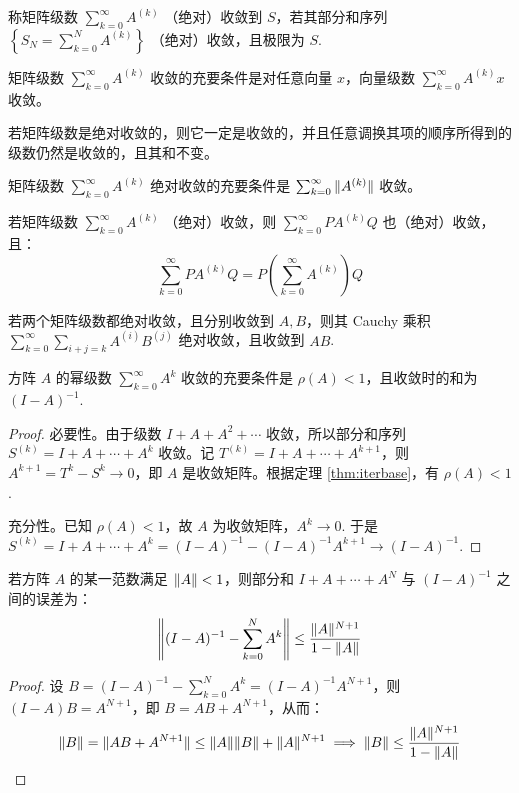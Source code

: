 \begin{definition}[矩阵级数的收敛与绝对收敛]
称矩阵级数 $\sum_{k=0}^\infty A^{(k)}$ （绝对）收敛到 $S$，若其部分和序列 $\left\{S_N=\sum_{k=0}^N A^{(k)}\right\}$ （绝对）收敛，且极限为 $S$.
\end{definition}

\begin{property}
矩阵级数 $\sum_{k=0}^\infty A^{(k)}$ 收敛的充要条件是对任意向量 $x$，向量级数 $\sum_{k=0}^\infty A^{(k)}x$ 收敛。
\end{property}

\begin{property}
若矩阵级数是绝对收敛的，则它一定是收敛的，并且任意调换其项的顺序所得到的级数仍然是收敛的，且其和不变。
\end{property}

\begin{property}
矩阵级数 $\sum_{k=0}^\infty A^{(k)}$ 绝对收敛的充要条件是 $\sum_{k=0}^\infty\Vert A^{(k)}\Vert$ 收敛。
\end{property}

\begin{property}
若矩阵级数 $\sum_{k=0}^\infty A^{(k)}$ （绝对）收敛，则 $\sum_{k=0}^\infty PA^{(k)}Q$ 也（绝对）收敛，且：
\[
    \sum_{k=0}^\infty PA^{(k)}Q=P\left(\sum_{k=0}^\infty A^{(k)}\right)Q
\]
\end{property}

\begin{property}
若两个矩阵级数都绝对收敛，且分别收敛到 $A,B$，则其 Cauchy 乘积 $\sum_{k=0}^\infty\sum_{i+j=k}A^{(i)}B^{(j)}$ 绝对收敛，且收敛到 $AB$.
\end{property}

\begin{theorem}
方阵 $A$ 的幂级数 $\sum_{k=0}^\infty A^k$ 收敛的充要条件是 $\rho(A)<1$，且收敛时的和为 $(I-A)^{-1}$.
\end{theorem}
\begin{proof}
必要性。由于级数 $I+A+A^2+\cdots$ 收敛，所以部分和序列 $S^{(k)}=I+A+\cdots+A^k$ 收敛。记 $T^{(k)}=I+A+\cdots+A^{k+1}$，则 $A^{k+1}=T^k-S^k\to0$，即 $A$ 是收敛矩阵。根据定理 \ref{thm:iterbase}，有 $\rho(A)<1$.

充分性。已知 $\rho(A)<1$，故 $A$ 为收敛矩阵，$A^k\to 0$.  于是 $S^{(k)}=I+A+\cdots+A^k=(I-A)^{-1}-(I-A)^{-1}A^{k+1}\to(I-A)^{-1}$.
\end{proof}

\begin{theorem}
若方阵 $A$ 的某一范数满足 $\Vert A\Vert<1$，则部分和 $I+A+\cdots+A^N$ 与 $(I-A)^{-1}$ 之间的误差为：
\[
    \left\Vert(I-A)^{-1}-\sum_{k=0}^NA^k\right\Vert\leq\frac{\Vert A\Vert^{N+1}}{1-\Vert A\Vert}
\]
\end{theorem}
\begin{proof}
设 $B=(I-A)^{-1}-\sum_{k=0}^NA^k=(I-A)^{-1}A^{N+1}$，则 $(I-A)B=A^{N+1}$，即 $B=AB+A^{N+1}$，从而：
\[
    \Vert B\Vert=\Vert AB+A^{N+1}\Vert\leq\Vert A\Vert\Vert B\Vert+\Vert A\Vert^{N+1}\implies\Vert B\Vert\leq\frac{\Vert A\Vert^{N+1}}{1-\Vert A\Vert}
\]
\end{proof}

